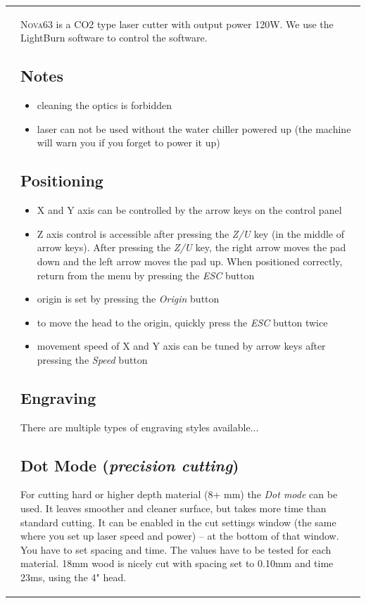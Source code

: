 \documentclass[fleqn]{article}
\begin{document}
\begin{tabular}{@{}
                         p{}%
		         @{\hspace{.04\columnwidth}}%
		         p{}%
		         @{}%
}
\par\bigskip

&\large
\lettrine[lines=2]{N}{ova63} is a CO2 type laser cutter with output power 120W. We use the LightBurn software to control the software.

\subsection{Notes}
\begin{itemize}[noitemsep,topsep=0pt]
	\item cleaning the optics is forbidden
	\item laser can not be used without the water chiller powered up (the machine will warn you if you forget to power it up)
\end{itemize}

\subsection{Positioning}
\begin{itemize}[noitemsep,topsep=0pt]
	\item X and Y axis can be controlled by the arrow keys on the control panel 
	\item Z axis control is accessible after pressing the \textit{Z/U} key (in the middle of arrow keys). After pressing the \textit{Z/U} key, the right arrow moves the pad down and the left arrow moves the pad up. When positioned correctly, return from the menu by pressing the \textit{ESC} button
	\item origin is set by pressing the \textit{Origin} button
	\item to move the head to the origin, quickly press the \textit{ESC} button twice
	\item movement speed of X and Y axis can be tuned by arrow keys after pressing the \textit{Speed} button
\end{itemize}

\subsection{Engraving}
There are multiple types of engraving styles available...

\subsection{Dot Mode (\textit{precision cutting})}
For cutting hard or higher depth material (8+ mm) the \textit{Dot mode} can be used. It leaves smoother and cleaner surface, but takes more time than standard cutting. It can be enabled in the cut settings window (the same where you set up laser speed and power) -- at the bottom of that window. You have to set spacing and time. The values have to be tested for each material. 18mm wood is nicely cut with spacing set to 0.10mm and time 23ms, using the 4" head.




\end{tabular}
\end{document}

